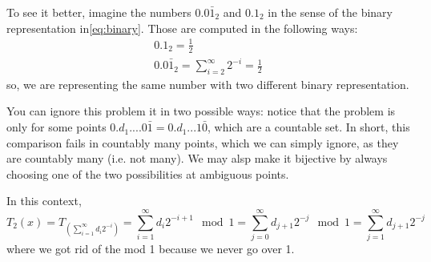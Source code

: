 \begin{example}[of map]
    To see it better, imagine the numbers $0.0\bar{1}_2$ and $0.1_2$ in the sense of the binary representation in\autoref{eq:binary}. Those are computed in the following ways: \begin{align*}
        0.1_2=\frac{1}{2} \\
        0.0\bar{1}_2=\sum_{i=2}^{\infty}2^{-i}=\frac{1}{2}
    \end{align*}
    so, we are representing the same number with two different binary representation.
    
    You can ignore this problem it in two possible ways: notice that the problem is only for some points $0.d_1....0\bar{1}=0.d_1...1\bar{0}$, which are a countable set. In short, this comparison fails in countably many points, which we can simply ignore, as they are countably many (i.e. not many). We may alsp make it bijective by always choosing one of the two possibilities at ambiguous points.

    In this context, \begin{equation*}
        T_2(x)=T_(\sum_{i=1}^{\infty}d_i2^{-i})=\sum_{i=1}^{\infty}d_i2^{-i+1}\mod 1=\sum_{j=0}^{\infty}d_{j+1}2^{-j}\mod 1=\sum_{j=1}^{\infty}d_{j+1}2^{-j}
    \end{equation*}
    where we got rid of the mod 1 because we never go over 1.

    \begin{figure}[ht]
    \centering
\end{figure}
\end{example}
